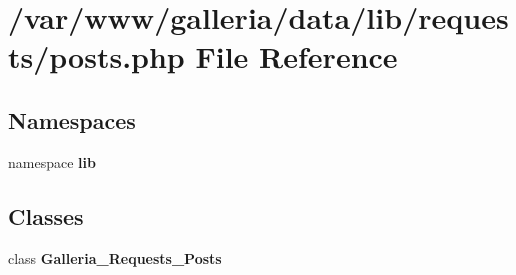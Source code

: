 \section{/var/www/galleria/data/lib/requests/posts.php File Reference}
\label{posts_8php}
\subsection*{Namespaces}
\begin{CompactItemize}
\item 
namespace {\bf lib}
\end{CompactItemize}
\subsection*{Classes}
\begin{CompactItemize}
\item 
class {\bf Galleria\_\-Requests\_\-Posts}
\end{CompactItemize}
